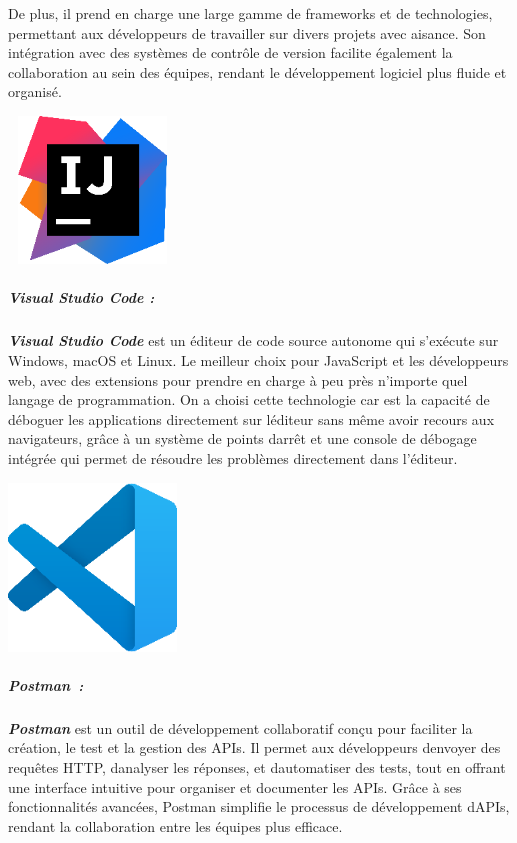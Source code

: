 \documentclass[12pt,a4paper,twoside]{report}
\begin{document}
De plus, il prend en charge une large gamme de frameworks et de
technologies, permettant aux développeurs de travailler sur divers
projets avec aisance. Son intégration avec des systèmes de contrôle de
version facilite également la collaboration au sein des équipes, rendant
le développement logiciel plus fluide et organisé.

\includegraphics[width=1.76111in,height=1.54444in]{latex_media/media/image31.png}

\hypertarget{visual-studio-code}{%
\subparagraph{Visual Studio Code :}\label{visual-studio-code}}

\emph{\textbf{Visual Studio Code}} est un éditeur de code source
autonome qui s'exécute sur Windows, macOS et Linux. Le meilleur choix
pour JavaScript et les développeurs web, avec des extensions pour
prendre en charge à peu près n'importe quel langage de programmation. On
a choisi cette technologie car est la capacité de déboguer les
applications directement sur l\textquotesingle éditeur sans même avoir
recours aux navigateurs, grâce à un système de points
d\textquotesingle arrêt et une console de débogage intégrée qui permet
de résoudre les problèmes directement dans l'éditeur.~

\includegraphics[width=1.76177in,height=1.76177in]{latex_media/media/image32.png}

\hypertarget{postman}{%
\subparagraph{Postman~:}\label{postman}}

\emph{\textbf{Postman}} est un outil de développement collaboratif conçu
pour faciliter la création, le test et la gestion des APIs. Il permet
aux développeurs d\textquotesingle envoyer des requêtes HTTP,
d\textquotesingle analyser les réponses, et
d\textquotesingle automatiser des tests, tout en offrant une interface
intuitive pour organiser et documenter les APIs. Grâce à ses
fonctionnalités avancées, Postman simplifie le processus de
développement d\textquotesingle APIs, rendant la collaboration entre les
équipes plus efficace.
\end{document}
